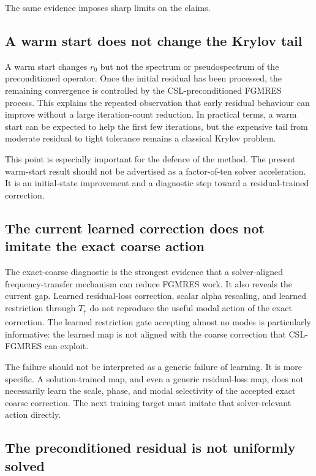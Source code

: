 The same evidence imposes sharp limits on the claims.

\subsection{A warm start does not change the Krylov tail}
\label{subsec:discussion-warm-tail}

A warm start changes $r_0$ but not the spectrum or pseudospectrum of the
preconditioned operator. Once the initial residual has been processed, the
remaining convergence is controlled by the CSL-preconditioned FGMRES process.
This explains the repeated observation that early residual behaviour can
improve without a large iteration-count reduction. In practical terms, a warm
start can be expected to help the first few iterations, but the expensive tail
from moderate residual to tight tolerance remains a classical Krylov problem.

This point is especially important for the defence of the method. The present
warm-start result should not be advertised as a factor-of-ten solver
acceleration. It is an initial-state improvement and a diagnostic step toward
a residual-trained correction.

\subsection{The current learned correction does not imitate the exact coarse action}
\label{subsec:discussion-learned-correction-fails}

The exact-coarse diagnostic is the strongest evidence that a solver-aligned
frequency-transfer mechanism can reduce FGMRES work. It also reveals the
current gap. Learned residual-loss correction, scalar alpha rescaling, and
learned restriction through $T_\uparrow$ do not reproduce the useful modal
action of the exact correction. The learned restriction gate accepting almost
no modes is particularly informative: the learned map is not aligned with the
coarse correction that CSL-FGMRES can exploit.

The failure should not be interpreted as a generic failure of learning. It is
more specific. A solution-trained map, and even a generic residual-loss map,
does not necessarily learn the scale, phase, and modal selectivity of the
accepted exact coarse correction. The next training target must imitate that
solver-relevant action directly.

\subsection{The preconditioned residual is not uniformly solved}
\label{subsec:discussion-precond-residual}

